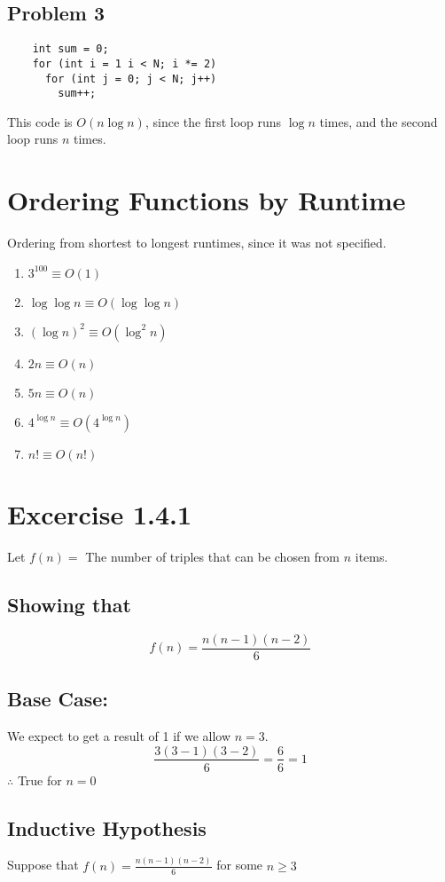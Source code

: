 \documentclass[12pt]{article}
\begin{document}
\subsection{Problem 3}
\begin{verbatim}
	int sum = 0;
	for (int i = 1 i < N; i *= 2)
	  for (int j = 0; j < N; j++)
	    sum++;
\end{verbatim}
This code is $ O(n \log n) $, since the first loop runs $ \log n $ times, and the second loop runs $ n $ times.

\section{Ordering Functions by Runtime}
Ordering from shortest to longest runtimes, since it was not specified.
\begin{enumerate}
	\item $ 3^{100} \equiv O(1) $
	\item $ \log \log n \equiv O(\log \log n) $
	\item $ (\log n)^2 \equiv O(\log^2 n) $
	\item $ 2n \equiv O(n) $
	\item $ 5n \equiv O(n) $
	\item $ 4^{\log n} \equiv O(4^{\log n}) $
	\item $ n! \equiv O(n!) $
\end{enumerate}

\section{Excercise 1.4.1}
Let $ f(n) = $ The number of triples that can be chosen from $n$ items. \\
\subsection{Showing that}
\begin{displaymath}
	f(n) = \frac{n(n-1)(n-2)}{6}
\end{displaymath}
\subsection{Base Case:}
We expect to get a result of 1 if we allow $ n = 3 $.
\begin{displaymath}
	\frac{3(3-1)(3-2)}{6} = \frac{6}{6} = 1
\end{displaymath}
$ \therefore $ True for $ n = 0 $
\subsection{Inductive Hypothesis}
Suppose that $ f(n) = \frac{n(n-1)(n-2)}{6} $ for some $ n \geq 3 $
\end{document}
